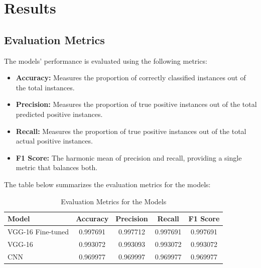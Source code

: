 \documentclass{report} %
\begin{document}
\chapter{Results}  %

\section{Evaluation Metrics}

The models' performance is evaluated using the following metrics:

\begin{itemize}
    \item \textbf{Accuracy:} Measures the proportion of correctly classified instances out of the total instances.
    \item \textbf{Precision:} Measures the proportion of true positive instances out of the total predicted positive instances.
    \item \textbf{Recall:} Measures the proportion of true positive instances out of the total actual positive instances.
    \item \textbf{F1 Score:} The harmonic mean of precision and recall, providing a single metric that balances both.
\end{itemize}

The table below summarizes the evaluation metrics for the models:

\begin{table}[H]
  \centering
  \caption{Evaluation Metrics for the Models}
  \vspace{0.5cm} %
  \begin{tabular}{@{\hskip 5pt} l @{\hskip 10pt} c @{\hskip 10pt} c @{\hskip 10pt} c @{\hskip 10pt} c @{\hskip 5pt}}
  \toprule
  \textbf{Model} & \textbf{Accuracy} & \textbf{Precision} & \textbf{Recall} & \textbf{F1 Score} \\
  \midrule
  VGG-16 Fine-tuned  & 0.997691 & 0.997712 & 0.997691 & 0.997691 \\
  VGG-16  & 0.993072 & 0.993093 & 0.993072 & 0.993072 \\
  CNN        & 0.969977 & 0.969997 & 0.969977 & 0.969977 \\
  \bottomrule
  \end{tabular}
\end{table}
\end{document}
